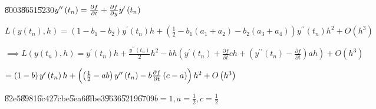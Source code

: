 \documentclass{article}
\begin{document}
\U{8003}\U{8651}\U{5230}$y^{\prime \prime }\left( t_{n}\right) =\frac{%
\partial f}{\partial t}+\frac{\partial f}{\partial y}y^{\prime }\left(
t_{n}\right) $

$L\left( y\left( t_{n}\right) ,h\right) =\left( 1-b_{1}-b_{2}\right)
y^{\prime }\left( t_{n}\right) h+\left( \frac{1}{2}-b_{1}\left(
a_{1}+a_{2}\right) -b_{2}\left( a_{3}+a_{4}\right) \right) y^{\prime \prime
}\left( t_{n}\right) h^{2}+O\left( h^{3}\right) $

$\implies L\left( y\left( t_{n}\right) ,h\right) =y^{\prime }\left(
t_{n}\right) h+\frac{y^{\prime \prime }\left( t_{n}\right) }{2}%
h^{2}-bh\left( y^{\prime }\left( t_{n}\right) +\frac{\partial f}{\partial t}%
ch+\left( y^{\prime \prime }\left( t_{n}\right) -\frac{\partial f}{\partial t%
}\right) ah\right) +O\left( h^{3}\right) $

$=\left( 1-b\right) y^{\prime }\left( t_{n}\right) h+\left( \left( \frac{1}{2%
}-ab\right) y^{\prime \prime }\left( t_{n}\right) -b\frac{\partial f}{%
\partial t}\left( c-a\right) \right) h^{2}+O\left( h^{3}\right) $

\U{82e5}\U{8981}\U{6c42}\U{7cbe}\U{5ea6}\U{8fbe}3\U{9636}\U{5219}\U{6709}$%
b=1,a=\frac{1}{2},c=\frac{1}{2}$
\end{document}

